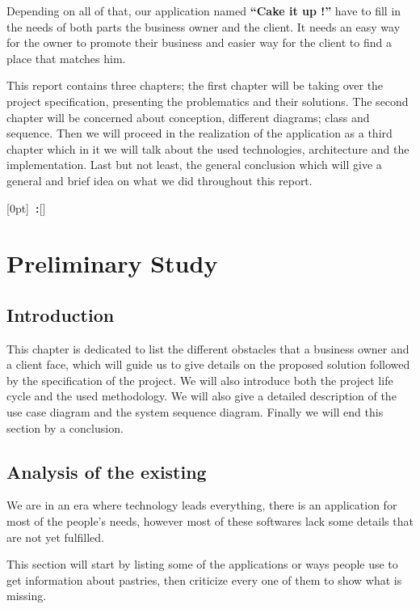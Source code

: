 \documentclass[12pt,a4paper]{report}
\newcommand{\setupname}[1][\chaptername]{
	\titlecontents{chapter}[0pt]{\vspace{1ex}}{\bfseries#1~\thecontentslabel:\quad}{\bfseries}{\bfseries\hfill\contentspage}[]
}
\begin{document}
	Depending on all of that, our application named \textbf{``Cake it up !''} have to fill in the needs of both parts the business owner and the client. It needs an easy way for the owner to promote their business and easier way for the client to find a place that matches him.\par
	This report contains three chapters; the first chapter will be taking over the project specification, presenting the problematics and their solutions. The second chapter will be concerned about conception, different diagrams; class and sequence. Then we will proceed in the realization of the application as a third chapter which in it we will talk about the used technologies, architecture and the implementation. Last but not least, the general conclusion which will give a general and brief idea on what we did throughout this report.\par
	
	\pagestyle{fancy}
	\fancyhf{}
	\fancyhead[LE,RO]{\leftmark}
	\fancyfoot[CE,CO]{\thepage}
	\renewcommand{\footrulewidth}{0.4pt}
	\setupname
	\chapter{Preliminary Study }
	\section*{Introduction}
	This chapter is dedicated to list the different obstacles that a business owner and a client face, which will guide us to give details on the proposed solution followed by the specification of the project. We will also introduce both the project life cycle and the used methodology. We will also give a detailed description of the use case diagram and the system sequence diagram. Finally we will end this section by a conclusion.
	
	\section{Analysis of the existing}
	We are in an era where technology leads everything, there is an application for most of the people's needs, however most of these softwares lack some details that are not yet fulfilled.\par
	This section will start by listing some of the applications or ways people use to get information about pastries, then criticize every one of them to show what is missing.
\end{document}
